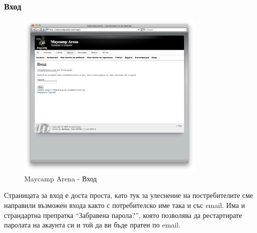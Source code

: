 \documentclass[a4paper,12pt]{article}
\begin{document}
  \subsubsection{Вход}
  \begin{figure}[ht]
    \begin{center}
      \includegraphics[width=0.8\textwidth]{maycamp_arena_login.png}
    \end{center}
    \caption{Maycamp Arena - Вход}
    \label{arena_login}
  \end{figure}
  Страницата за вход е доста проста, като тук за улеснение на постребителите сме направили възможен входа както с потребителско име така и със email. Има и страндартна препратка ``Забравена парола?'', която позволява да рестартирате паролата на акаунта си и той да ви бъде пратен по email.
  
\end{document}
